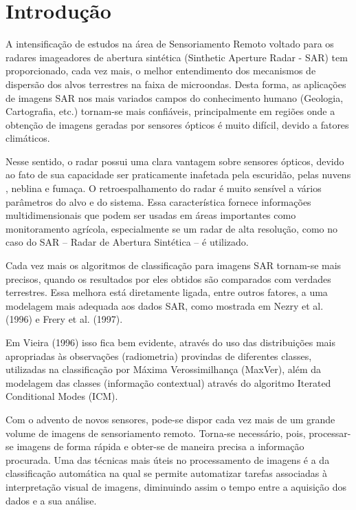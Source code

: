 \documentclass[a4paper, 12pt, english]{article}
\begin{document}
\newpage
\section{Introdução}
A intensificação de estudos na área de Sensoriamento Remoto voltado para os
radares imageadores de abertura sintética (Sinthetic Aperture Radar - SAR) tem
proporcionado, cada vez mais, o melhor entendimento dos mecanismos de dispersão dos
alvos terrestres na faixa de microondas. Desta forma, as aplicações de imagens SAR nos
mais variados campos do conhecimento humano (Geologia, Cartografia, etc.) tornam-se
mais confiáveis, principalmente em regiões onde a obtenção de imagens geradas por
sensores ópticos é muito difícil, devido a fatores climáticos.

Nesse sentido, o radar possui uma clara vantagem sobre sensores ópticos, devido
ao fato de sua capacidade ser praticamente inafetada pela escuridão, pelas nuvens ,
neblina e fumaça. O retroespalhamento do radar é muito sensível a vários parâmetros do
alvo e do sistema. Essa característica fornece informações multidimensionais que podem
ser usadas em áreas importantes como monitoramento agrícola, especialmente se um
radar de alta resolução, como no caso do SAR – Radar de Abertura Sintética – é utilizado.

Cada vez mais os algoritmos de classificação para imagens SAR tornam-se mais
precisos, quando os resultados por eles obtidos são comparados com verdades terrestres.
Essa melhora está diretamente ligada, entre outros fatores, a uma modelagem mais
adequada aos dados SAR, como mostrada em Nezry et al. (1996) e Frery et al. (1997).

Em Vieira (1996) isso fica bem evidente, através do uso das distribuições mais
apropriadas às observações (radiometria) provindas de diferentes classes, utilizadas na
classificação por Máxima Verossimilhança (MaxVer), além da modelagem das classes
(informação contextual) através do algoritmo Iterated Conditional Modes (ICM).

Com o advento de novos sensores, pode-se dispor cada vez mais de um grande
volume de imagens de sensoriamento remoto. Torna-se necessário, pois, processar-se
imagens de forma rápida e obter-se de maneira precisa a informação procurada. Uma das
técnicas mais úteis no processamento de imagens é a da classificação automática na qual
se permite automatizar tarefas associadas à interpretação visual de imagens, diminuindo
assim o tempo entre a aquisição dos dados e a sua análise.
\end{document}
